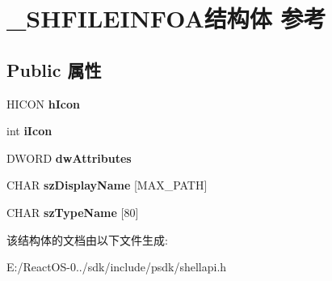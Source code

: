 \hypertarget{struct___s_h_f_i_l_e_i_n_f_o_a}{}\section{\+\_\+\+S\+H\+F\+I\+L\+E\+I\+N\+F\+O\+A结构体 参考}
\label{struct___s_h_f_i_l_e_i_n_f_o_a}
\subsection*{Public 属性}
\begin{DoxyCompactItemize}
\item 
\mbox{\label{struct___s_h_f_i_l_e_i_n_f_o_a_a32584baea51e7bb5fd909e57039e1c3f}} 
H\+I\+C\+ON {\bfseries h\+Icon}
\item 
\mbox{\label{struct___s_h_f_i_l_e_i_n_f_o_a_ac131039b0ef7c856915fff42746405ff}} 
int {\bfseries i\+Icon}
\item 
\mbox{\label{struct___s_h_f_i_l_e_i_n_f_o_a_a5cf0ef44c7ce5448e20237cbc4c34857}} 
D\+W\+O\+RD {\bfseries dw\+Attributes}
\item 
\mbox{\label{struct___s_h_f_i_l_e_i_n_f_o_a_a972668e33be9b86894fd076c7e781942}} 
C\+H\+AR {\bfseries sz\+Display\+Name} \mbox{[}M\+A\+X\+\_\+\+P\+A\+TH\mbox{]}
\item 
\mbox{\label{struct___s_h_f_i_l_e_i_n_f_o_a_a0b5b7f6fc72aa43b0cbd8647e731fca1}} 
C\+H\+AR {\bfseries sz\+Type\+Name} \mbox{[}80\mbox{]}
\end{DoxyCompactItemize}


该结构体的文档由以下文件生成\+:\begin{DoxyCompactItemize}
\item 
E\+:/\+React\+O\+S-\/0../sdk/include/psdk/shellapi.\+h\end{DoxyCompactItemize}
